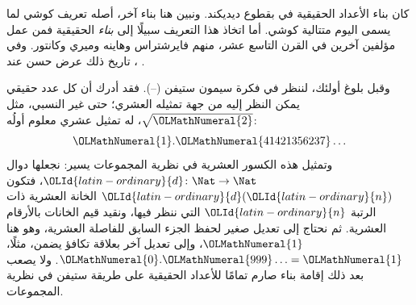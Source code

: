 \documentclass[../../../include/open-logic-section]{subfiles}
\begin{document}


كان بناء الأعداد الحقيقية في  بقطوع ديديكند. ونبين هنا بناء آخر، أصله تعريف كوشي لما يسمى اليوم متتالية كوشي. أما اتخاذ هذا التعريف سبيلًا إلى \emph{بناء} الحقيقية فمن عمل مؤلفين آخرين في القرن التاسع عشر، منهم فايرشتراس وهاينه وميري وكانتور. وفي تاريخ ذلك عرض حسن عند \citeauthor{OConnorRobertson:RN}، \citeyear{OConnorRobertson:RN}.

وقبل بلوغ أولئك، لننظر في فكرة سيمون ستيفن (--). فقد أدرك أن كل عدد حقيقي يمكن النظر إليه من جهة تمثيله العشري؛ حتى غير النسبي، مثل $\sqrt{{\OLMathNumeral{2}}}$، له تمثيل عشري معلوم أولُه:
\[
	{\OLMathNumeral{1}}.{\OLMathNumeral{41421356237}}\ldots
\]
وتمثيل هذه الكسور العشرية في نظرية المجموعات يسير: نجعلها دوال ${\OLId{latin-ordinary}{d}} \colon \Nat \to \Nat$، فتكون ${\OLId{latin-ordinary}{d}}({\OLId{latin-ordinary}{n}})$ الخانة العشرية ذات الرتبة ${\OLId{latin-ordinary}{n}}$ التي ننظر فيها، ونقيد قيم الخانات بالأرقام العشرية. ثم نحتاج إلى تعديل صغير لحفظ الجزء السابق للفاصلة العشرية، وهو هنا ${\OLMathNumeral{1}}$، وإلى تعديل آخر بعلاقة تكافؤ يضمن، مثلًا، ${\OLMathNumeral{0}}.{\OLMathNumeral{999}}\ldots = {\OLMathNumeral{1}}$. ولا يصعب بعد ذلك إقامة بناء صارم تمامًا للأعداد الحقيقية على طريقة ستيفن في نظرية المجموعات.
\end{document}
